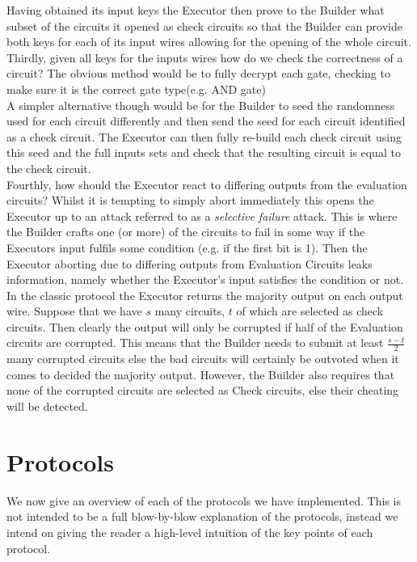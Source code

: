 \documentclass[ %
                    author={Nicholas Tutte},
                supervisor={Prof. Nigel Smart},
                    degree={MEng},
                     title={Secure Two Party Computation},
                  subtitle={A practical comparison of recent protocols},
                      type={Research - GG1K},
                      year={2015} ]{dissertation}
\begin{document}
				{Having obtained its input keys the Executor then prove to the Builder what subset of the circuits it opened as check circuits so that the Builder can provide both keys for each of its input wires allowing for the opening of the whole circuit.}\\

				{Thirdly, given all keys for the inputs wires how do we check the correctness of a circuit? The obvious method would be to fully decrypt each gate, checking to make sure it is the correct gate type(e.g. AND gate)}\\

				A simpler alternative though would be for the Builder to seed the randomness used for each circuit differently and then send the seed for each circuit identified as a check circuit. The Executor can then fully re-build each check circuit using this seed and the full inputs sets and check that the resulting circuit is equal to the check circuit.\\

				Fourthly, how should the Executor react to differing outputs from the evaluation circuits? Whilst it is tempting to simply abort immediately this opens the Executor up to an attack referred to as a \emph{selective failure} attack. This is where the Builder crafts one (or more) of the circuits to fail in some way if the Executors input fulfils some condition (e.g. if the first bit is 1). Then the Executor aborting due to differing outputs from Evaluation Circuits leaks information, namely whether the Executor's input satisfies the condition or not.\\

				In the classic protocol the Executor returns the majority output on each output wire. Suppose that we have $s$ many circuits, $t$ of which are selected as check circuits. Then clearly the output will only be corrupted if half of the Evaluation circuits are corrupted. This means that the Builder needs to submit at least $\frac{s - t}{2}$ many corrupted circuits else the bad circuits will certainly be outvoted when it comes to decided the majority output. However, the Builder also requires that none of the corrupted circuits are selected as Check circuits, else their cheating will be detected.

	\chapter{Protocols} \label{sec:Protocols}
		We now give an overview of each of the protocols we have implemented. This is not intended to be a full blow-by-blow explanation of the protocols, instead we intend on giving the reader a high-level intuition of the key points of each protocol.
\end{document}
